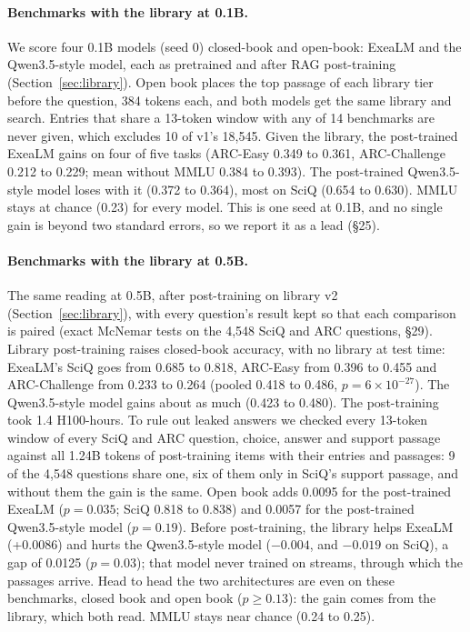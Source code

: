 \documentclass[10pt,twocolumn,letterpaper]{article}
\newcommand{\sect}[1]{\S#1}
\begin{document}
\paragraph{Benchmarks with the library at 0.1B.}
We score four 0.1B models (seed 0) closed-book and open-book: ExeaLM and the Qwen3.5-style model, each as pretrained and after RAG post-training (Section~\ref{sec:library}).
Open book places the top passage of each library tier before the question, 384 tokens each, and both models get the same library and search.
Entries that share a 13-token window with any of 14 benchmarks are never given, which excludes 10 of v1's 18,545.
Given the library, the post-trained ExeaLM gains on four of five tasks (ARC-Easy 0.349 to 0.361, ARC-Challenge 0.212 to 0.229; mean without MMLU 0.384 to 0.393).
The post-trained Qwen3.5-style model loses with it (0.372 to 0.364), most on SciQ (0.654 to 0.630).
MMLU stays at chance (0.23) for every model.
This is one seed at 0.1B, and no single gain is beyond two standard errors, so we report it as a lead (\sect{25}).

\paragraph{Benchmarks with the library at 0.5B.}
The same reading at 0.5B, after post-training on library v2 (Section~\ref{sec:library}), with every question's result kept so that each comparison is paired (exact McNemar tests on the 4,548 SciQ and ARC questions, \sect{29}).
Library post-training raises closed-book accuracy, with no library at test time: ExeaLM's SciQ goes from 0.685 to 0.818, ARC-Easy from 0.396 to 0.455 and ARC-Challenge from 0.233 to 0.264 (pooled 0.418 to 0.486, $p = 6\times10^{-27}$).
The Qwen3.5-style model gains about as much (0.423 to 0.480).
The post-training took 1.4 H100-hours.
To rule out leaked answers we checked every 13-token window of every SciQ and ARC question, choice, answer and support passage against all 1.24B tokens of post-training items with their entries and passages: 9 of the 4,548 questions share one, six of them only in SciQ's support passage, and without them the gain is the same.
Open book adds 0.0095 for the post-trained ExeaLM ($p = 0.035$; SciQ 0.818 to 0.838) and 0.0057 for the post-trained Qwen3.5-style model ($p = 0.19$).
Before post-training, the library helps ExeaLM (+0.0086) and hurts the Qwen3.5-style model ($-0.004$, and $-0.019$ on SciQ), a gap of 0.0125 ($p = 0.03$); that model never trained on streams, through which the passages arrive.
Head to head the two architectures are even on these benchmarks, closed book and open book ($p \ge 0.13$): the gain comes from the library, which both read.
MMLU stays near chance (0.24 to 0.25).
\end{document}
